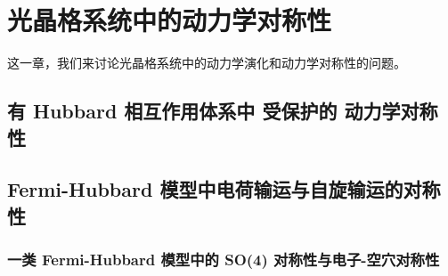 \chapter{光晶格系统中的动力学对称性}

这一章，我们来讨论光晶格系统中的动力学演化和动力学对称性的问题。



\section{有 Hubbard 相互作用体系中 受保护的 动力学对称性}\label{sec:dynsymm}





\section{Fermi-Hubbard 模型中电荷输运与自旋输运的对称性}\label{sec:diffusion}



\subsection{一类 Fermi-Hubbard 模型中的 SO(4) 对称性与电子-空穴对称性}\label{sec:so4}




